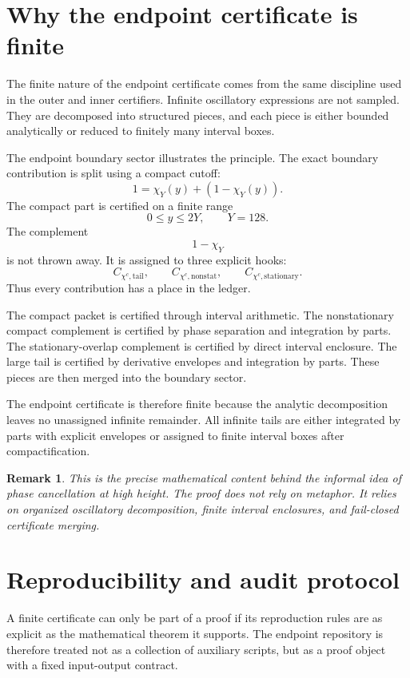 \documentclass[11pt]{article}
\newtheorem{remark}[theorem]{Remark}
\begin{document}
\section{Why the endpoint certificate is finite}

The finite nature of the endpoint certificate comes from the same discipline used in the outer and inner certifiers. Infinite oscillatory expressions are not sampled. They are decomposed into structured pieces, and each piece is either bounded analytically or reduced to finitely many interval boxes.

The endpoint boundary sector illustrates the principle. The exact boundary contribution is split using a compact cutoff:
\[
1=\chi_Y(y)+(1-\chi_Y(y)).
\]
The compact part is certified on a finite range
\[
0\leq y\leq2Y,
\qquad
Y=128.
\]
The complement
\[
1-\chi_Y
\]
is not thrown away. It is assigned to three explicit hooks:
\[
C_{\chi^c,\mathrm{tail}},
\qquad
C_{\chi^c,\mathrm{nonstat}},
\qquad
C_{\chi^c,\mathrm{stationary}}.
\]
Thus every contribution has a place in the ledger.

The compact packet is certified through interval arithmetic. The nonstationary compact complement is certified by phase separation and integration by parts. The stationary-overlap complement is certified by direct interval enclosure. The large tail is certified by derivative envelopes and integration by parts. These pieces are then merged into the boundary sector.

The endpoint certificate is therefore finite because the analytic decomposition leaves no unassigned infinite remainder. All infinite tails are either integrated by parts with explicit envelopes or assigned to finite interval boxes after compactification.

\begin{remark}
This is the precise mathematical content behind the informal idea of phase cancellation at high height. The proof does not rely on metaphor. It relies on organized oscillatory decomposition, finite interval enclosures, and fail-closed certificate merging.
\end{remark}




\section{Reproducibility and audit protocol}

A finite certificate can only be part of a proof if its reproduction rules are as explicit as the mathematical theorem it supports.  The endpoint repository is therefore treated not as a collection of auxiliary scripts, but as a proof object with a fixed input-output contract.
\end{document}

